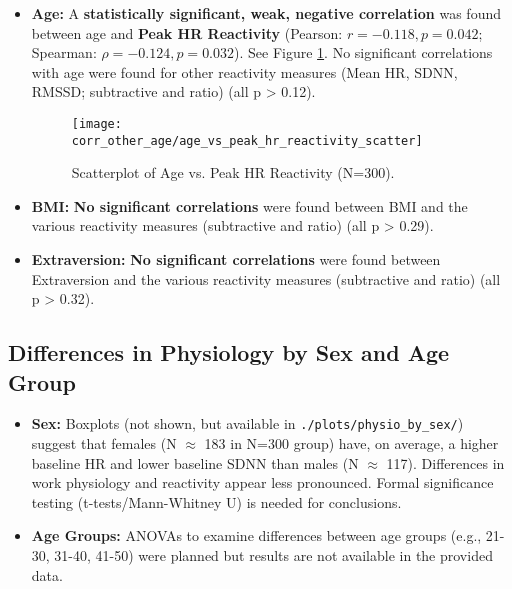\documentclass[11pt, a4paper]{report}
\newcommand{\jsoncite}[1]{\href{run:./data/#1.json}{\texttt{\detokenize{#1.json}}}}
\begin{document}
\begin{itemize}
    \item \textbf{Age:} A \textbf{statistically significant, weak, negative correlation} was found between age and \textbf{Peak HR Reactivity} (Pearson: $r = -0.118, p = 0.042$; Spearman: $\rho = -0.124, p = 0.032$). See Figure \ref{fig:scatter_age_peakhr_results}. No significant correlations with age were found for other reactivity measures (Mean HR, SDNN, RMSSD; subtractive and ratio) (all p > 0.12).
    \begin{figure}[H]
        \centering
        \texttt{[image: corr\_other\_age/age\_vs\_peak\_hr\_reactivity\_scatter]}
        \caption{Scatterplot of Age vs. Peak HR Reactivity (N=300).}
        \label{fig:scatter_age_peakhr_results}
    \end{figure}

    \item \textbf{BMI:} \textbf{No significant correlations} were found between BMI and the various reactivity measures (subtractive and ratio) (all p > 0.29).

    \item \textbf{Extraversion:} \textbf{No significant correlations} were found between Extraversion and the various reactivity measures (subtractive and ratio) (all p > 0.32).
\end{itemize}

\subsection{Differences in Physiology by Sex and Age Group}
\label{subsec:results_physio_subgroups_add} %
\begin{itemize}
    \item \textbf{Sex:} Boxplots (not shown, but available in \texttt{./plots/physio\_by\_sex/}) suggest that females (N $\approx$ 183 in N=300 group) have, on average, a higher baseline HR and lower baseline SDNN than males (N $\approx$ 117). Differences in work physiology and reactivity appear less pronounced. Formal significance testing (t-tests/Mann-Whitney U) is needed for conclusions.
    \item \textbf{Age Groups:} ANOVAs to examine differences between age groups (e.g., 21-30, 31-40, 41-50) were planned but results are not available in the provided data.
\end{itemize}
\end{document}
